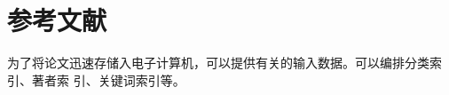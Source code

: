 \documentclass{zhbook}
\begin{document}
\appendix



\section{参考文献}

为了将论文迅速存储入电子计算机，可以提供有关的输入数据。可以编排分类索引、著者索
引、关键词索引等。

\nocite{*}

%
%

\appendix


\end{document}
